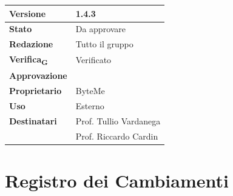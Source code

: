 \documentclass[11pt,a4paper]{article}
\newcommand{\gls}[1]{#1\textsubscript{G}}
\begin{document}
\begin{titlepage}
    \begin{table}[H]
        \centering
        \begin{tabular}{|l|p{5cm}|}
            \hline
            \textbf{Versione} & 1.4.3 \\
            \hline
            \textbf{Stato} & Da approvare \\
            \hline
            \textbf{Redazione} & Tutto il gruppo \\
            \hline
            \textbf{\gls{Verifica}} & Verificato \\
            \hline
            \textbf{Approvazione} & \\
            \hline
            \textbf{Proprietario} & ByteMe \\
            \hline
            \textbf{Uso} & Esterno \\
            \hline
            \textbf{Destinatari} & Prof. Tullio Vardanega \\ & Prof. Riccardo Cardin \\
            \hline
        \end{tabular}
    \end{table}
    
    \vfill
\end{titlepage}

\thispagestyle{empty}
\section*{Registro dei Cambiamenti}
\end{document}
